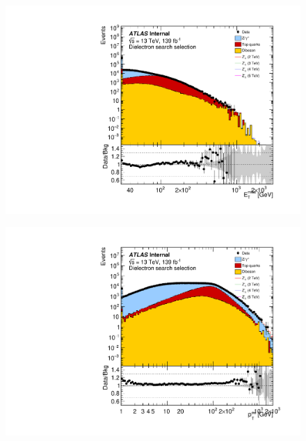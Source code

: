 \begin{figure}[h!]
\captionsetup[subfigure]{position=b}
\centering
 \begin{minipage}[b]{.45\linewidth}
    \includegraphics[width=1\textwidth]{figures/ci/dataMc/stacks_mc16e_2015-2018_ee_met_log100.pdf}
    \subcaption{}\label{fig:1a}
\end{minipage}
\begin{minipage}[b]{.45\linewidth}
    \includegraphics[width=1\textwidth]{figures/ci/dataMc/stacks_mc16e_2015-2018_ee_ptll_log100.pdf}
    \subcaption{}
\end{minipage} \\
\begin{minipage}[b]{.45\linewidth}

\end{minipage}
\end{figure}
